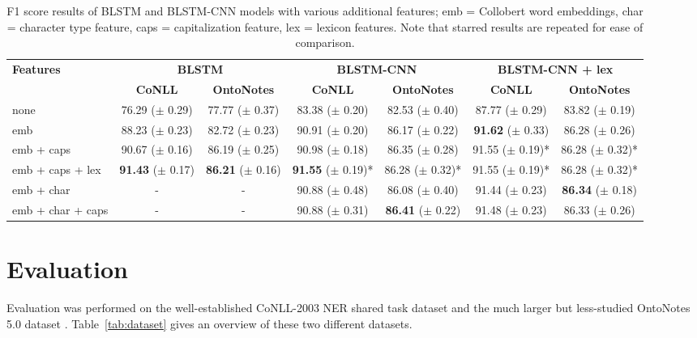 \documentclass[11pt,letterpaper]{article}
\begin{document}
\begin{table*}[ht!]
\begin{center}
\footnotesize
\begin{tabular}{|l|c|c|c|c|c|c|}
\hline 
\multirow{2}{*}{\bf Features} & \multicolumn{2}{|c|}{\bf BLSTM} & \multicolumn{2}{|c|}{\bf BLSTM-CNN} & \multicolumn{2}{|c|}{\bf BLSTM-CNN + lex} \\ \cline{2-7}
& \bf CoNLL & \bf OntoNotes & \bf CoNLL & \bf OntoNotes & \bf CoNLL & \bf OntoNotes\\ \hline
none & 76.29 ($\pm$ 0.29) & 77.77 ($\pm$ 0.37) & 83.38 ($\pm$ 0.20) & 82.53 ($\pm$ 0.40) & 87.77 ($\pm$ 0.29) & 83.82 ($\pm$ 0.19) \\
emb & 88.23 ($\pm$ 0.23) & 82.72 ($\pm$ 0.23) & 90.91 ($\pm$ 0.20) & 86.17 ($\pm$ 0.22) & {\bf 91.62} ($\pm$ 0.33) & 86.28 ($\pm$ 0.26) \\
emb + caps       & 90.67 ($\pm$ 0.16) & 86.19 ($\pm$ 0.25) & 90.98 ($\pm$ 0.18) & 86.35 ($\pm$ 0.28) & 91.55 ($\pm$ 0.19)* & 86.28 ($\pm$ 0.32)* \\
emb + caps + lex & {\bf 91.43} ($\pm$ 0.17) & {\bf 86.21} ($\pm$ 0.16) & {\bf 91.55} ($\pm$ 0.19)* & 86.28 ($\pm$ 0.32)* & 91.55 ($\pm$ 0.19)* & 86.28 ($\pm$ 0.32)* \\ \hline
emb + char & \-- & \-- & 90.88 ($\pm$ 0.48) & 86.08 ($\pm$ 0.40) & 91.44 ($\pm$ 0.23) & {\bf 86.34} ($\pm$ 0.18) \\
emb + char + caps & \-- & \-- & 90.88 ($\pm$ 0.31) & {\bf 86.41} ($\pm$ 0.22) & 91.48 ($\pm$ 0.23) & 86.33 ($\pm$ 0.26) \\ \hline

\end{tabular}
\end{center}
\caption{F1 score results of BLSTM and BLSTM-CNN models with various additional features; emb = Collobert word embeddings, char = character type feature, caps = capitalization feature, lex = lexicon features. Note that starred results are repeated for ease of comparison.}
\label{tab:res-feat-no-cnn}
\end{table*}

\section{Evaluation}

Evaluation was performed on the well-established CoNLL-2003 NER shared task dataset \cite{conll2003} and the much larger but less-studied OntoNotes 5.0 dataset \cite{ontonotes2006,pradhan2013}. Table~\ref{tab:dataset} gives an overview of these two different datasets.
\end{document}
